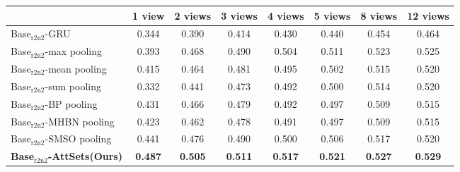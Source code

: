 \documentclass[twocolumn]{svjour3}    \pdfoutput=1
\newcommand{\nickname}{AttSets}
\begin{document}
\begin{table*}[t]
\caption{Group 1: mean IoU for multi-view reconstruction of all 40 categories in ModelNet40 testing split. All networks are firstly trained given only 1 image for each object in Stage 1. The \nickname{} module is further trained given \textbf{12 images} per object in Stage 2, while other competing approaches are fine-tuned given \textbf{12 images} per object in Stage 2.}
\centering
\label{tab:iou_modelnet_12v}
\tabcolsep=0.4cm
\begin{tabular}{ l|ccccccc}
\hline
&1 view&2 views&3 views& 4 views&5 views&8 views&12 views \\
\hline
Base$_{\textrm{r2n2}}$-GRU &0.344&0.390&0.414&0.430&0.440&0.454&0.464\\
Base$_{\textrm{r2n2}}$-max pooling &0.393&0.468&0.490&0.504&0.511&0.523&0.525\\
Base$_{\textrm{r2n2}}$-mean pooling &0.415&0.464&0.481&0.495&0.502&0.515&0.520\\
Base$_{\textrm{r2n2}}$-sum pooling &0.332&0.441&0.473&0.492&0.500&0.514&0.520\\
Base$_{\textrm{r2n2}}$-BP pooling &0.431&0.466&0.479&0.492&0.497&0.509&0.515\\
Base$_{\textrm{r2n2}}$-MHBN pooling &0.423&0.462&0.478&0.491&0.497&0.509&0.515\\
Base$_{\textrm{r2n2}}$-SMSO pooling &0.441&0.476&0.490&0.500&0.506&0.517&0.520\\
\textbf{Base$_{\textrm{r2n2}}$-\nickname{}(Ours)} &\textbf{0.487}&\textbf{0.505}&\textbf{0.511}&\textbf{0.517}&\textbf{0.521}&\textbf{0.527}
&\textbf{0.529} \\
\hline
\end{tabular}
\end{table*}
\end{document}
